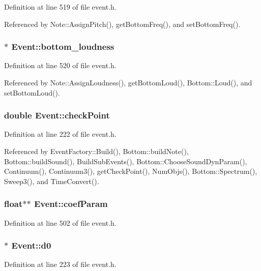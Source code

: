 Definition at line 519 of file event.h.

Referenced by Note::Assign\-Pitch(), get\-Bottom\-Freq(), and set\-Bottom\-Freq().
\subsubsection{$\ast$ {\bf Event::bottom\_\-loudness}\hspace{0.3cm}{\tt  [protected]}}\label{classEvent_p1}




Definition at line 520 of file event.h.

Referenced by Note::Assign\-Loudness(), get\-Bottom\-Loud(), Bottom::Loud(), and set\-Bottom\-Loud().
\subsubsection{\setlength{\rightskip}{0pt plus 5cm}double {\bf Event::check\-Point}}\label{classEvent_o0}




Definition at line 222 of file event.h.

Referenced by Event\-Factory::Build(), Bottom::build\-Note(), Bottom::build\-Sound(), Build\-Sub\-Events(), Bottom::Choose\-Sound\-Dyn\-Param(), Continuum(), Continuum3(), get\-Check\-Point(), Num\-Objs(), Bottom::Spectrum(), Sweep3(), and Time\-Convert().
\subsubsection{\setlength{\rightskip}{0pt plus 5cm}float$\ast$$\ast$ {\bf Event::coef\-Param}}\label{classEvent_o52}




Definition at line 502 of file event.h.
\subsubsection{ $\ast$ {\bf Event::d0}}\label{classEvent_o2}




Definition at line 223 of file event.h.

